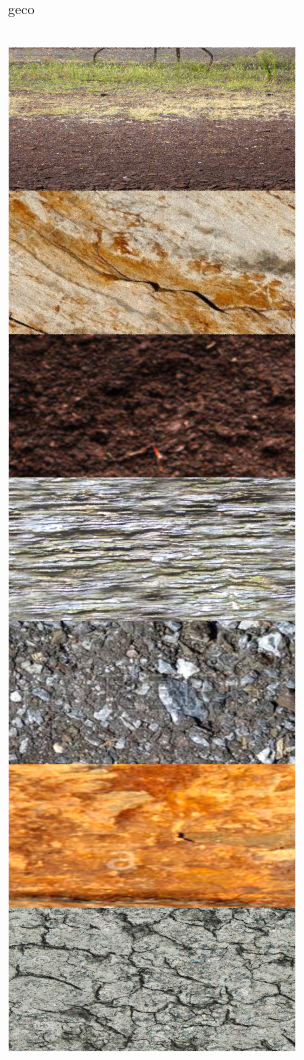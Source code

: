 \documentclass{beamer}
\begin{document}
\begin{frame}{geco}
\begin{columns}
\begin{column}{0.2\textwidth}
\includegraphics[width=0.9\columnwidth]{figure/gecoover}

\end{column}
\end{columns}
\end{frame}
\end{document}
